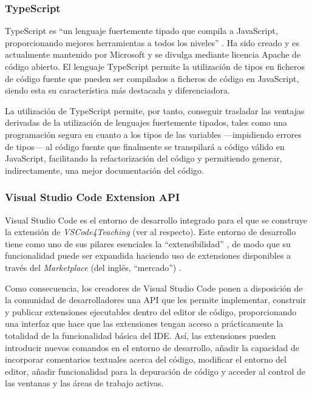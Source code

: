 \subsubsection{TypeScript}
TypeScript es ``un lenguaje fuertemente tipado que compila a JavaScript, proporcionando mejores herramientas a todos los niveles'' \cite{Tec_TS}. Ha sido creado y es actualmente mantenido por Microsoft y se divulga mediante licencia Apache de código abierto. El lenguaje TypeScript permite la utilización de tipos en ficheros de código fuente que pueden ser compilados a ficheros de código en JavaScript, siendo esta su característica más destacada y diferenciadora.

La utilización de TypeScript permite, por tanto, conseguir trasladar las ventajas derivadas de la utilización de lenguajes fuertemente tipados, tales como una programación segura en cuanto a los tipos de las variables ---impidiendo errores de tipos--- al código fuente que finalmente se transpilará a código válido en JavaScript, facilitando la refactorización del código y permitiendo generar, indirectamente, una mejor documentación del código.

\subsubsection{Visual Studio Code Extension API}
Visual Studio Code es el entorno de desarrollo integrado para el que se construye la extensión de \textit{VSCode4Teaching} (ver  al respecto). Este entorno de desarrollo tiene como uno de sus pilares esenciales la ``extensibilidad'' \cite{Tec_VSCodeExtAPI}, de modo que su funcionalidad puede ser expandida haciendo uso de extensiones disponibles a través del \textit{Marketplace} (del inglés, ``mercado'') \cite{Tec_VSCPublish}.

Como consecuencia, los creadores de Visual Studio Code ponen a disposición de la comunidad de desarrolladores una API que les permite implementar, construir y publicar extensiones ejecutables dentro del editor de código, proporcionando una interfaz que hace que las extensiones tengan acceso a prácticamente la totalidad de la funcionalidad básica del IDE. Así, las extensiones pueden introducir nuevos comandos en el entorno de desarrollo, añadir la capacidad de incorporar comentarios textuales acerca del código, modificar el entorno del editor, añadir funcionalidad para la depuración de código y acceder al control de las ventanas y las áreas de trabajo activas.

